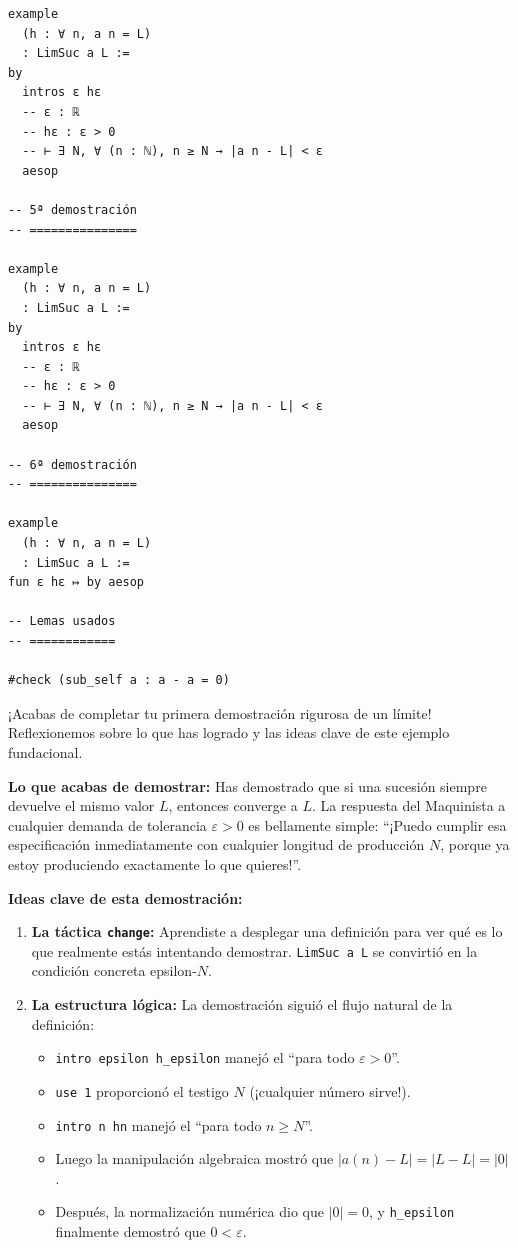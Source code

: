 \begin{verbatim}
example
  (h : ∀ n, a n = L)
  : LimSuc a L :=
by
  intros ε hε
  -- ε : ℝ
  -- hε : ε > 0
  -- ⊢ ∃ N, ∀ (n : ℕ), n ≥ N → |a n - L| < ε
  aesop

-- 5ª demostración
-- ===============

example
  (h : ∀ n, a n = L)
  : LimSuc a L :=
by
  intros ε hε
  -- ε : ℝ
  -- hε : ε > 0
  -- ⊢ ∃ N, ∀ (n : ℕ), n ≥ N → |a n - L| < ε
  aesop

-- 6ª demostración
-- ===============

example
  (h : ∀ n, a n = L)
  : LimSuc a L :=
fun ε hε ↦ by aesop

-- Lemas usados
-- ============

#check (sub_self a : a - a = 0)
\end{verbatim}

¡Acabas de completar tu primera demostración rigurosa de un límite!
Reflexionemos sobre lo que has logrado y las ideas clave de este ejemplo
fundacional.

\textbf{Lo que acabas de demostrar:} Has demostrado que si una sucesión
siempre devuelve el mismo valor $L$, entonces converge a $L$. La
respuesta del Maquinista a cualquier demanda de tolerancia
$\varepsilon > 0$ es bellamente simple: ``¡Puedo cumplir esa especificación
inmediatamente con cualquier longitud de producción $N$, porque ya estoy
produciendo exactamente lo que quieres!''.

\textbf{Ideas clave de esta demostración:}
\begin{enumerate}
\item \textbf{La táctica \texttt{change}:} Aprendiste a desplegar una
  definición para ver qué es lo que realmente estás intentando
  demostrar. \texttt{LimSuc a L} se convirtió en la condición concreta
  epsilon-$N$.
\item \textbf{La estructura lógica:} La demostración siguió el flujo
  natural de la definición:
    \begin{itemize}
    \item \texttt{intro epsilon h\_epsilon} manejó el ``para todo
      $\varepsilon > 0$''.
    \item \texttt{use 1} proporcionó el testigo $N$ (¡cualquier número
      sirve!).
    \item \texttt{intro n hn} manejó el ``para todo $n \geq N$''.
    \item Luego la manipulación algebraica mostró que
      $|a(n) - L| = |L - L| = |0|$.
    \item Después, la normalización numérica dio que $|0| = 0$, y
      \texttt{h\_epsilon} finalmente demostró que $0 < \varepsilon$.
    \end{itemize}
\end{enumerate}

